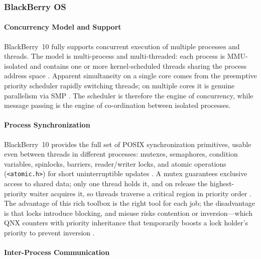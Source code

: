 \subsubsection{BlackBerry OS}

\paragraph{Concurrency Model and Support}

BlackBerry~10 fully supports concurrent execution of multiple
processes and threads. The model is multi-process and multi-threaded:
each process is MMU-isolated and contains one or more kernel-scheduled
threads sharing the process address space \citep{qnx_kernel_sysarch}. Apparent
simultaneity on a single core comes from the preemptive priority
scheduler rapidly switching threads; on multiple cores it is genuine
parallelism via SMP \citep{qnx_kernel_sysarch, qnx_ham}. The scheduler
is therefore the engine of concurrency, while message passing is the
engine of co-ordination between isolated processes.

\paragraph{Process Synchronization}

BlackBerry~10 provides the full set of POSIX synchronization
primitives, usable even between threads in different processes:
mutexes, semaphores, condition variables, spinlocks, barriers,
reader/writer locks, and atomic operations (\texttt{<atomic.h>}) for
short uninterruptible updates \citep{qnx_kernel_sysarch}. A mutex guarantees exclusive
access to shared data; only one thread holds it, and on release the
highest-priority waiter acquires it, so threads traverse a critical
region in priority order \citep{qnx_kernel_sysarch}. The advantage of
this rich toolbox is the right tool for each job; the disadvantage is
that locks introduce blocking, and misuse risks contention or
inversion---which QNX counters with priority inheritance that
temporarily boosts a lock holder's priority to prevent inversion
\citep{qnx_kernel_sysarch, qnx_kernel_sync}.

\paragraph{Inter-Process Communication}

